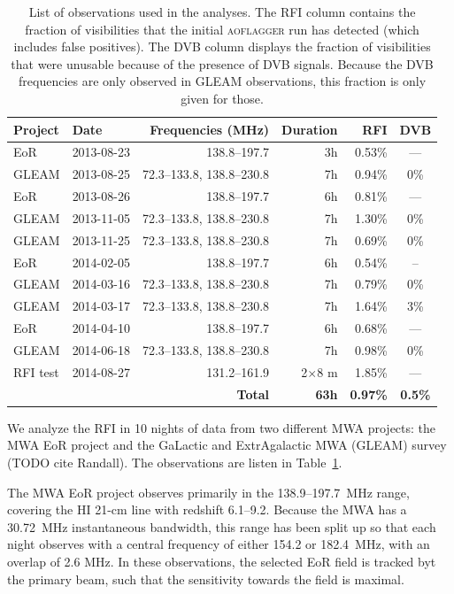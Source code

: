 \documentclass[useAMS,usenatbib]{mn2e}
\begin{document}
\begin{table}
\caption{List of observations used in the analyses. The RFI column contains the fraction of visibilities that the initial \textsc{aoflagger} run has detected (which includes false positives). The DVB column displays the fraction of visibilities that were unusable because of the presence of DVB signals. Because the DVB frequencies are only observed in GLEAM observations, this fraction is only given for those. }\label{tbl:obs-list}
\begin{tabular}{|l|l|r|r|r|c|}
\hline
\textbf{Project} &\textbf{Date} & \textbf{Frequencies (MHz)} & \textbf{Duration} & RFI & DVB \\
\hline
EoR   & 2013-08-23 & 138.8--197.7              & 3h & 0.53\% & ---\\
GLEAM & 2013-08-25 & 72.3--133.8, 138.8--230.8 & 7h & 0.94\% & 0\% \\
EoR   & 2013-08-26 & 138.8--197.7              & 6h & 0.81\% & ---\\
GLEAM & 2013-11-05 & 72.3--133.8, 138.8--230.8 & 7h & 1.30\% & 0\% \\
GLEAM & 2013-11-25 & 72.3--133.8, 138.8--230.8 & 7h & 0.69\% & 0\% \\
EoR   & 2014-02-05 & 138.8--197.7              & 6h & 0.54\% & -- \\
GLEAM & 2014-03-16 & 72.3--133.8, 138.8--230.8 & 7h & 0.79\% & 0\% \\
GLEAM & 2014-03-17 & 72.3--133.8, 138.8--230.8 & 7h & 1.64\% & 3\% \\
EoR   & 2014-04-10 & 138.8--197.7              & 6h & 0.68\% & ---\\
GLEAM & 2014-06-18 & 72.3--133.8, 138.8--230.8 & 7h & 0.98\% & 0\% \\
RFI test&2014-08-27& 131.2--161.9     & 2$\times$8 m& 1.85\% & --- \\
\hline
\multicolumn{3}{|r|}{\textbf{Total}} & \textbf{63h} & \textbf{0.97\%} & \textbf{0.5\%}\\
\hline
\end{tabular}
\end{table}

We analyze the RFI in 10 nights of data from two different MWA projects: the MWA EoR project \citep{bowman-science-with-the-mwa-2013} and the GaLactic and ExtrAgalactic MWA (GLEAM) survey (TODO cite Randall). The observations are listen in Table~\ref{tbl:obs-list}.

The MWA EoR project observes primarily in the 138.9--197.7~MHz range, covering the HI 21-cm line with redshift 6.1--9.2. Because the MWA has a 30.72~MHz instantaneous bandwidth, this range has been split up so that each night observes with a central frequency of either 154.2 or 182.4~MHz, with an overlap of 2.6 MHz. In these observations, the selected EoR field is tracked byt the primary beam, such that the sensitivity towards the field is maximal.
\end{document}
